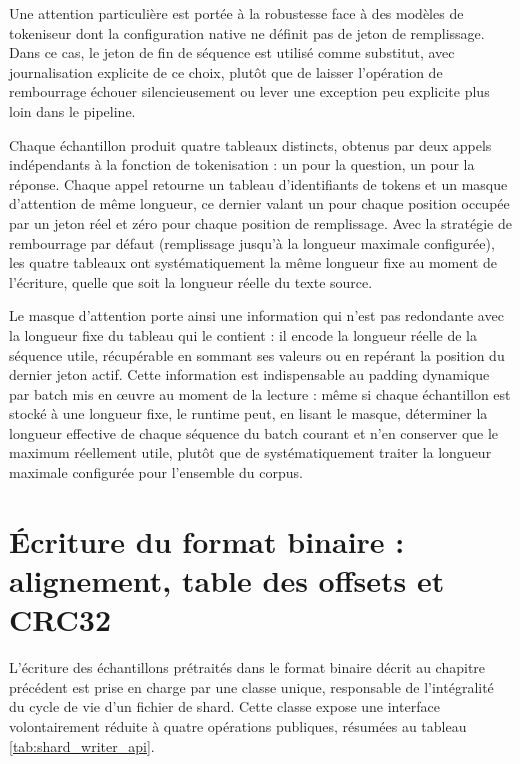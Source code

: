 \documentclass[12pt,a4paper]{report}
\begin{document}
Une attention particulière est portée à la robustesse face à des modèles de tokeniseur dont la configuration native ne définit pas de jeton de remplissage. Dans ce cas, le jeton de fin de séquence est utilisé comme substitut, avec journalisation explicite de ce choix, plutôt que de laisser l'opération de rembourrage échouer silencieusement ou lever une exception peu explicite plus loin dans le pipeline.

Chaque échantillon produit quatre tableaux distincts, obtenus par deux appels indépendants à la fonction de tokenisation : un pour la question, un pour la réponse. Chaque appel retourne un tableau d'identifiants de tokens et un masque d'attention de même longueur, ce dernier valant un pour chaque position occupée par un jeton réel et zéro pour chaque position de remplissage. Avec la stratégie de rembourrage par défaut (remplissage jusqu'à la longueur maximale configurée), les quatre tableaux ont systématiquement la même longueur fixe au moment de l'écriture, quelle que soit la longueur réelle du texte source.

Le masque d'attention porte ainsi une information qui n'est pas redondante avec la longueur fixe du tableau qui le contient : il encode la longueur réelle de la séquence utile, récupérable en sommant ses valeurs ou en repérant la position du dernier jeton actif. Cette information est indispensable au padding dynamique par batch mis en œuvre au moment de la lecture : même si chaque échantillon est stocké à une longueur fixe, le runtime peut, en lisant le masque, déterminer la longueur effective de chaque séquence du batch courant et n'en conserver que le maximum réellement utile, plutôt que de systématiquement traiter la longueur maximale configurée pour l'ensemble du corpus.

\section{Écriture du format binaire : alignement, table des offsets et CRC32}
\label{sec:ecriture_binaire}

L'écriture des échantillons prétraités dans le format binaire décrit au chapitre précédent est prise en charge par une classe unique, responsable de l'intégralité du cycle de vie d'un fichier de shard. Cette classe expose une interface volontairement réduite à quatre opérations publiques, résumées au tableau \ref{tab:shard_writer_api}.
\end{document}
